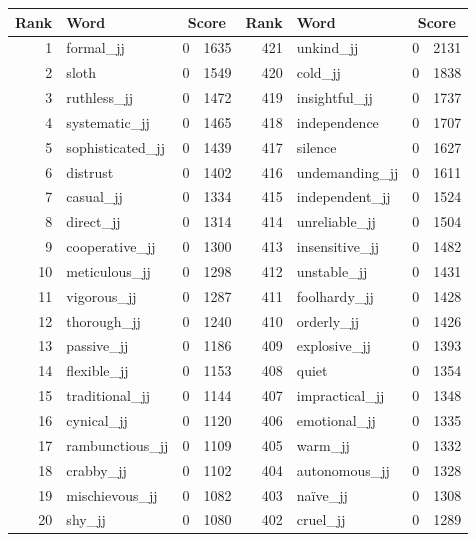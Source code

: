 \begin{table}[tbp]
    \begin{tabular}{| rlr@{.}l | rlr@{.}l |}
    \hline
    \textbf{Rank} & \textbf{Word} & \multicolumn{2}{c|}{\textbf{Score}} & \textbf{Rank} & \textbf{Word} & \multicolumn{2}{c|}{\textbf{Score}} \\
    \hline
    1 & formal\_jj & 0 & 1635    &    421 & unkind\_jj & 0 & 2131 \\
    2 & sloth & 0 & 1549    &    420 & cold\_jj & 0 & 1838 \\
    3 & ruthless\_jj & 0 & 1472    &    419 & insightful\_jj & 0 & 1737 \\
    4 & systematic\_jj & 0 & 1465    &    418 & independence & 0 & 1707 \\
    5 & sophisticated\_jj & 0 & 1439    &    417 & silence & 0 & 1627 \\
    6 & distrust & 0 & 1402    &    416 & undemanding\_jj & 0 & 1611 \\
    7 & casual\_jj & 0 & 1334    &    415 & independent\_jj & 0 & 1524 \\
    8 & direct\_jj & 0 & 1314    &    414 & unreliable\_jj & 0 & 1504 \\
    9 & cooperative\_jj & 0 & 1300    &    413 & insensitive\_jj & 0 & 1482 \\
    10 & meticulous\_jj & 0 & 1298    &    412 & unstable\_jj & 0 & 1431 \\
    11 & vigorous\_jj & 0 & 1287    &    411 & foolhardy\_jj & 0 & 1428 \\
    12 & thorough\_jj & 0 & 1240    &    410 & orderly\_jj & 0 & 1426 \\
    13 & passive\_jj & 0 & 1186    &    409 & explosive\_jj & 0 & 1393 \\
    14 & flexible\_jj & 0 & 1153    &    408 & quiet & 0 & 1354 \\
    15 & traditional\_jj & 0 & 1144    &    407 & impractical\_jj & 0 & 1348 \\
    16 & cynical\_jj & 0 & 1120    &    406 & emotional\_jj & 0 & 1335 \\
    17 & rambunctious\_jj & 0 & 1109    &    405 & warm\_jj & 0 & 1332 \\
    18 & crabby\_jj & 0 & 1102    &    404 & autonomous\_jj & 0 & 1328 \\
    19 & mischievous\_jj & 0 & 1082    &    403 & naïve\_jj & 0 & 1308 \\
    20 & shy\_jj & 0 & 1080    &    402 & cruel\_jj & 0 & 1289 \\

\end{tabular}
\end{table}
